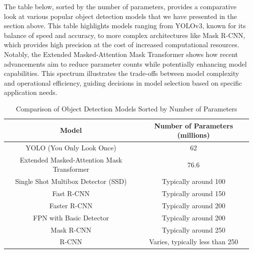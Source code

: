 \vspace{1.5cm}

The table below, sorted by the number of parameters, provides a comparative look at various popular object detection models that we have presented in the 
section above. This table highlights models ranging from YOLOv3, known for its balance of speed and accuracy, to more complex architectures like Mask R-CNN, 
which provides high precision at the cost of increased computational resources. Notably, the Extended Masked-Attention Mask Transformer shows how recent 
advancements aim to reduce parameter counts while potentially enhancing model capabilities. This spectrum illustrates the trade-offs between model complexity 
and operational efficiency, guiding decisions in model selection based on specific application needs.

\begin{table}[h]
    \centering
    \begin{tabular}{|c|c|}
    \hline
    \textbf{Model}                                 & \textbf{Number of Parameters (millions)} \\ \hline
    YOLO (You Only Look Once)                      & 62                                      \\ \hline
    Extended Masked-Attention Mask Transformer     & 76.6                                    \\ \hline
    Single Shot    Multibox Detector (SSD)         & Typically around 100                    \\ \hline
    Fast R-CNN                                     & Typically around 150                    \\ \hline
    Faster R-CNN                                   & Typically around 200                    \\ \hline
    FPN with Basic Detector                        & Typically around 200                    \\ \hline
    Mask R-CNN                                     & Typically around 250                    \\ \hline
    R-CNN                                          & Varies, typically less than 250         \\ \hline
    \end{tabular}
    \caption{Comparison of Object Detection Models Sorted by Number of Parameters}
    \label{tab:model_parameters}
    \end{table}
    
